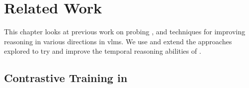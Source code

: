 \chapter{Related Work}
\label{chap:rel}

This chapter looks at previous work on probing ,
and techniques for improving reasoning in various directions in \acrlong{vlm}s. We use
and extend the approaches explored to try and improve the temporal reasoning
abilities of .

%


\section{Contrastive Training in }
\label{sec:contrastive}

